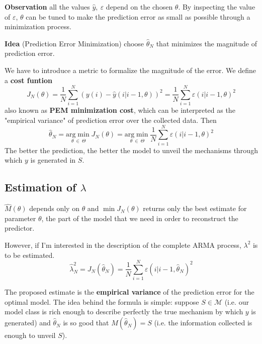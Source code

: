 \textbf{Observation}
all the values $ \hat{y} ,\ \varepsilon $ depend on the chosen $ \theta $. By inspecting the value of $ \varepsilon $, $ \theta $ can be tuned to make the prediction error as small as possible through a minimization process.

\textbf{Idea} (Prediction Error Minimization)
choose $ \hat{\theta }_{N}$ that minimizes the magnitude of prediction error.

We have to introduce a metric to formalize the magnitude of the error. We define a \textbf{cost funtion} 
\begin{equation*}
J_{N}(\theta) =\frac{1}{N}\sum _{i=1}^{N}(y(i) -\hat{y}(i|i-1,\theta))^{2} =\frac{1}{N}\sum _{i=1}^{N} \varepsilon (i|i-1,\theta)^{2}
\end{equation*}
also known as \textbf{PEM minimization cost}, which can be interpreted as the "empirical variance" of prediction error over the collected data. Then 
\begin{equation*}
\hat{\theta }_{N} =\underset{\theta \ \in \ \Theta }{\mathrm{arg}\min} J_{N}(\theta) =\underset{\theta \ \in \ \Theta }{\mathrm{arg}\min}\frac{1}{N}\sum _{i=1}^{N} \varepsilon (i|i-1,\theta)^{2}
\end{equation*}
The better the prediction, the better the model to unveil the mechanisms through which $ y$ is generated in $ S$. 

\subsection{Estimation of $\lambda$}

$ \hat{M}(\theta)$ depends only on $ \theta $ and $ \min J_{N}(\theta)$ returns only the best estimate for  parameter $ \theta $, the part of the model that we need in order to reconstruct the predictor.

However, if I'm interested in the description of the complete ARMA process, $ \lambda ^{2}$ is to be estimated. 
\begin{equation*}
\hat{\lambda }_{N}^{2} =J_{N}(\hat{\theta }_{N}) =\frac{1}{N}\sum _{i=1}^{N} \varepsilon (i|i-1,\hat{\theta }_{N})^{2}
\end{equation*}

The proposed estimate is the \textbf{empirical variance} of the prediction error for the optimal model. The idea behind the formula is simple: suppose $ S\in \mathcal{M} $ (i.e. our model class is rich enough to describe perfectly the true mechanism by which $ y$ is generated) and $\hat{\theta }_{N}$ is so good that $M(\hat{\theta }_{N}) =S$ (i.e. the information collected is enough to unveil $ S$).

